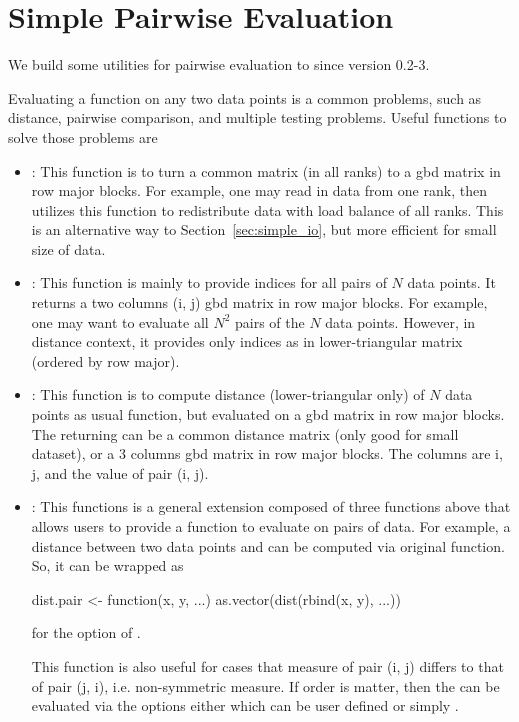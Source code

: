 
\section[Simple Pairwise Evaluation]{Simple Pairwise Evaluation}
\label{sec:simple_pairs}

We build some utilities for pairwise evaluation to
 since version 0.2-3.

Evaluating a function on any two data points is a common problems, such as
distance, pairwise comparison, and multiple testing problems.
Useful functions to solve those problems are
\begin{itemize}
\item
{}:
This function is to turn a common matrix (in all ranks)
to a gbd matrix in row major blocks. For example, one may read in data
from one rank, then utilizes this function to redistribute data with load
balance of all ranks. This is an alternative way to
Section~\ref{sec:simple_io}, but more efficient for small size of data.

\item
{}:
This function is mainly to provide indices for all pairs of $N$ data points.
It returns a two columns (i, j)  gbd matrix in row major blocks.
For example, one may want to evaluate all $N^2$ pairs of the $N$ data points.
However, in distance context, it provides only indices as in lower-triangular
matrix (ordered by row major).

\item
{}:
This function is to compute distance (lower-triangular only) of $N$ data points
as usual  function, but evaluated on a gbd matrix in row major
blocks. The returning can be a common distance matrix (only good for small
dataset), or a 3 columns gbd matrix in row major blocks. The columns are
i, j, and the value of pair (i, j).

\item
{}:
This functions is a general extension composed of three functions above
that allows
users to provide a function  to evaluate on pairs of data.
For example, a distance between two data points  and 
can be computed via original  function. So, it can be wrapped as
\begin{Code}
dist.pair <- function(x, y, ...){
  as.vector(dist(rbind(x, y), ...))
}
\end{Code}
for the  option of .

This function is also useful for cases that measure of pair (i, j)
differs to that of pair (j, i), i.e. non-symmetric measure.
If order is matter, then the 
can be evaluated via the options either 
which can be user defined or simply .
\end{itemize}

